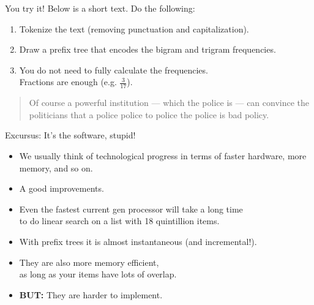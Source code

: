 \documentclass[professionalfonts, xcolor={usenames,svgnames,x11names,table}]{beamer}
\begin{document}
\begin{frame}{You try it!}
    Below is a short text.
    Do the following:
    \begin{enumerate}
        \item Tokenize the text (removing punctuation and capitalization).
        \item Draw a prefix tree that encodes the bigram and trigram frequencies.
        \item You do not need to fully calculate the frequencies.\\
              Fractions are enough (e.g. $\frac{3}{17}$).
    \end{enumerate}

    \begin{quote}
        Of course a powerful institution --- which the police is ---
        can convince the politicians that a police police to police the police is bad policy.
    \end{quote}

\end{frame}

\begin{frame}{Excursus: It's the software, stupid!}
    \begin{itemize}
        \item We usually think of technological progress in terms of faster hardware, more memory, and so on.
        \item A good  improvements.
    \end{itemize}

    \begin{example}
        \begin{itemize}
            \item Even the fastest current gen processor will take a long time\\
                to do linear search on a list with 18 quintillion items.
            \item With prefix trees it is almost instantaneous (and incremental!).
            \item They are also more memory efficient,\\
                  as long as your items have lots of overlap.
            \item \textbf{BUT:} They are harder to implement.
        \end{itemize}
    \end{example}
\end{frame}
\end{document}
